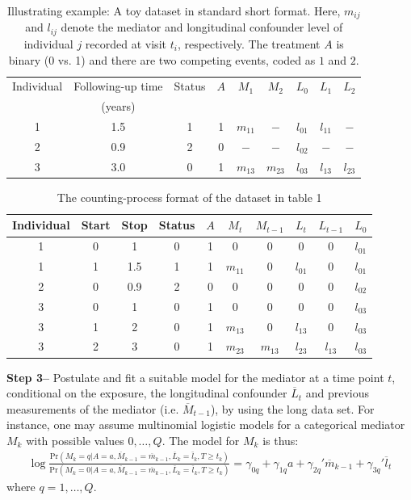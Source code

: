 \documentclass[AMA,STIX1COL]{WileyNJD-v2}
\newcommand{\pr}{\text{Pr}}
\begin{document}
\begin{table}
\centering
\caption{Illustrating example: A toy dataset in standard short format. Here, $m_{ij}$ and $l_{ij}$ denote the mediator and longitudinal confounder level of individual $j$ recorded at visit $t_i$, respectively. The treatment $A$ is binary (0 vs. 1) and there are two competing events, coded as $1$ and $2$.} 
\label{tab:ma}
\begin{tabular}{c c c c c c c c c}
\hline
   Individual & Following-up time  & Status & $A$ & $M_1$ & $M_2$ & $L_0$ & $L_1$ & $L_2$\\
&(years)\\ 
\hline
1 & 1.5 & 1 & 1 & $m_{11}$ & $-$      & $l_{01}$ & $l_{11}$ & $-$  \\
2 & 0.9 & 2 & 0 &  $-$   & $-$      & $l_{02}$ & $-$ & $-$ \\
3 & 3.0 & 0 & 1 & $m_{13}$ & $m_{23}$  & $l_{03}$ & $l_{13}$  & $l_{23}$\\
\hline
\end{tabular}
\end{table}
\begin{table}
\centering
\caption{The counting-process format of the dataset in table 1} 
\label{tab:ma}
\begin{tabular}{c c c c c c c c c c}
\hline
   Individual & Start & Stop & Status & $A$ & $M_t$ & $M_{t-1}$ & $L_t$ & $L_{t-1}$ & $L_0$\\ 
\hline
1 & 0 & 1    & 0 & 1 & 0   & 0     & 0     & 0    & $l_{01}$\\
1 & 1 & 1.5 & 1 & 1 & $m_{11}$ & 0     & $l_{01}$ & 0 & $l_{01}$ \\
2 & 0 & 0.9 & 2 & 0 & 0    & 0     & 0     & 0    & $l_{02}$\\
3 & 0 &    1 & 0 & 1 & 0    & 0     & 0     & 0    & $l_{03}$\\
3 & 1 &    2 & 0 & 1 & $m_{13}$ & 0 & $l_{13}$  & 0 & $l_{03}$ \\
3 & 2 &    3 & 0 & 1 & $m_{23}$ & $m_{13}$ & $l_{23}$ & $l_{13}$  & $l_{03}$\\
\hline
\end{tabular}
\end{table}

\textbf{Step 3--}  Postulate and fit a suitable model for the mediator at a time point $t$, conditional on the exposure, the longitudinal confounder $\overline{L}_t$ and previous measurements of the mediator (i.e. $\overline{M}_{t - 1}$), by using the long data set. For instance, one may assume multinomial logistic models for a categorical mediator $M_k$ with possible values $0, \ldots, Q$. The model for $M_k$ is thus:
\begin{align}
\log \frac{\pr(M_k = q|A = a, \overline{M}_{k - 1} = \overline{m}_{k - 1}, \overline{L}_k = \bar{l}_k, T\ge t_k)}{\pr(M_k = 0|A = a, \overline{M}_{k - 1} = \overline{m}_{k - 1}, \overline{L}_k =\overline{l}_k, T\ge t_k)} = \gamma_{0q} + \gamma_{1q} a + \gamma_{2q}'\overline{m}_{k - 1} + \gamma_{3q}'\overline{l}_t
\end{align}
where $q = 1, \ldots, Q$. 
\end{document}

